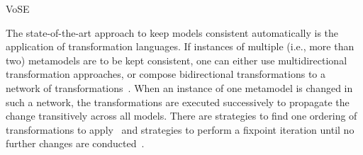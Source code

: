 \begin{copiedFrom}{VoSE}

The state-of-the-art approach to keep models consistent automatically is the application of transformation languages.
If instances of multiple (i.e., more than two) metamodels are to be kept consistent, one can either use multidirectional transformation approaches, or compose bidirectional transformations to a network of transformations~\cite{cleve2019dagstuhl}.
When an instance of one metamodel is changed in such a network, the transformations are executed successively to propagate the change transitively across all models.
There are strategies to find one ordering of transformations to apply~\cite{stevens2020BidirectionalTransformationLarge-SoSym} and strategies to perform a fixpoint iteration until no further changes are conducted~\cite{klare2019icmt}.








\end{copiedFrom}
